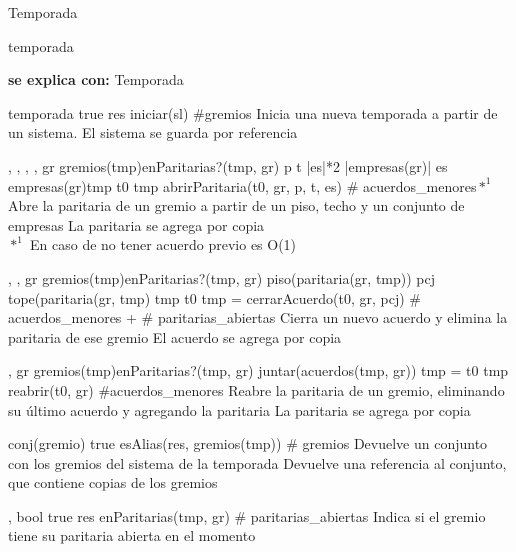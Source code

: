 \begin{interfaz}{Temporada}

\begin{iparamformales}{temporada}

\textbf{\large se explica con:} Temporada

\end{iparamformales}

{}{temporada}
{true}
{res \igobs iniciar(sl)}
{\#gremios}
{Inicia una nueva temporada a partir de un sistema.}
{El sistema se guarda por referencia}

{, , , , }{}
{gr \in gremios(tmp)\ly \neg enParitarias?(tmp, gr) \ly p \leq t \ly |es|*2 \leq |empresas(gr)| \ly es \subseteq empresas(gr)\ly tmp \igobs t0 }
{tmp \igobs abrirParitaria(t0, gr, p, t, es)  }
{\# acuerdos\_menores$*^1$}
{Abre la paritaria de un gremio a partir de un piso, techo y un conjunto de empresas}
{La paritaria se agrega por copia \\
$*^1$ En caso de no tener acuerdo previo es O(1)}

{,  ,  }{}
{ gr \in gremios(tmp)\lyl enParitarias?(tmp, gr) \ly piso(paritaria(gr, tmp)) \leq pcj \leq tope(paritaria(gr, tmp) \ly tmp \igobs t0 }
{tmp = cerrarAcuerdo(t0, gr, pcj)}
{ \# acuerdos\_menores + \# paritarias\_abiertas}
{Cierra un nuevo acuerdo y elimina la paritaria de ese gremio}
{El acuerdo se agrega por copia}

{, }{}
{gr \in gremios(tmp)\ly \neg enParitarias?(tmp, gr) \ly \emptyset \neq  juntar(acuerdos(tmp, gr)) \ly tmp = t0 }
{tmp \igobs reabrir(t0, gr) }
{\#acuerdos\_menores}
{Reabre la paritaria de un gremio, eliminando su \'ultimo acuerdo y agregando la paritaria}
{La paritaria se agrega por copia}

{}{conj(gremio)}
{true}
{ esAlias(res, gremios(tmp)) }
{ \# gremios }
{Devuelve un conjunto con los gremios del sistema de la temporada}
{Devuelve una referencia al conjunto, que contiene copias de los gremios}

{, }{bool}
{true}
{ res \igobs enParitarias(tmp, gr) }
{\# paritarias\_abiertas}
{Indica si el gremio tiene su paritaria abierta en el momento}
{}


\end{interfaz}
